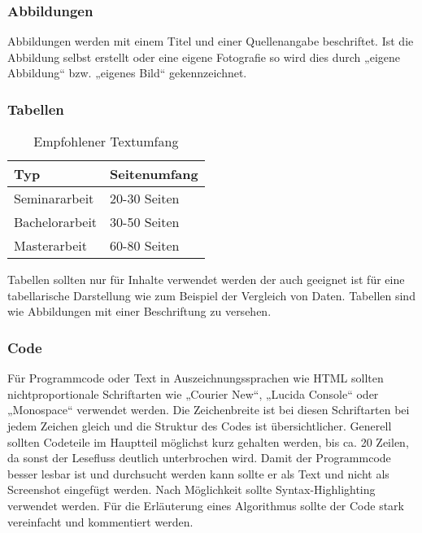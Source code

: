 \subsubsection{Abbildungen}\label{subsubsec:abbildungen}

Abbildungen werden mit einem Titel und einer Quellenangabe beschriftet. Ist die Abbildung selbst erstellt oder eine eigene Fotografie so wird dies durch „eigene Abbildung“ bzw. „eigenes Bild“ gekennzeichnet. 


\subsubsection{Tabellen}\label{subsubsec:tabellen}

{\renewcommand{\arraystretch}{1.5}
\begin{table}[h!]
\centering
\begin{tabular}{ l|l } 
\hline
\bfseries Typ & \bfseries Seitenumfang\\
\hline
Seminararbeit & 20-30 Seiten \\
Bachelorarbeit & 30-50 Seiten \\
Masterarbeit & 60-80 Seiten \\
\hline
\end{tabular}
\caption{Empfohlener Textumfang}
\label{table:textumfang}
\end{table}}

Tabellen sollten nur für Inhalte verwendet werden der auch geeignet ist für eine tabellarische Darstellung wie zum Beispiel der Vergleich von Daten. Tabellen sind wie Abbildungen mit einer Beschriftung zu versehen.

\subsubsection{Code}\label{subsubsec:code}

Für Programmcode oder Text in Auszeichnungssprachen wie HTML sollten nichtproportionale Schriftarten wie „Courier New“, „Lucida Console“ oder „Monospace“ verwendet werden. Die Zeichenbreite ist bei diesen Schriftarten bei jedem Zeichen gleich und die Struktur des Codes ist übersichtlicher. Generell sollten Codeteile im Hauptteil möglichst kurz gehalten werden, bis ca. 20 Zeilen, da sonst der Lesefluss deutlich unterbrochen wird.  Damit der Programmcode besser lesbar ist und durchsucht werden kann sollte er als Text und nicht als Screenshot eingefügt werden. Nach Möglichkeit sollte Syntax-Highlighting verwendet werden. Für die  Erläuterung eines Algorithmus sollte der Code stark vereinfacht und kommentiert werden.


